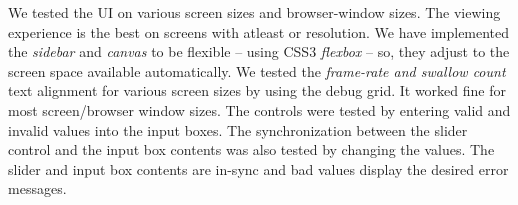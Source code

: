 \documentclass[../main]{subfiles}
\begin{document}
We tested the UI on various screen sizes and browser-window sizes. The viewing experience is the best on screens with atleast  or  resolution. We have implemented the {\em sidebar} and {\em canvas} to be flexible -- using CSS3 {\em flexbox} -- so, they adjust to the screen space available automatically. We tested the {\em frame-rate and swallow count} text alignment for various screen sizes by using the debug grid. It worked fine for most screen/browser window sizes. The controls were tested by entering valid and invalid values into the input boxes. The synchronization between the slider control and the input box contents was also tested by changing the values. The slider and input box contents are in-sync and bad values display the desired error messages.
\end{document}
